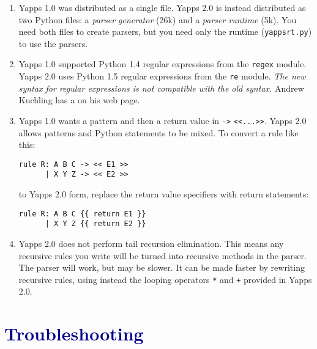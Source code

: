 \documentclass[10pt]{article}
\newcommand{\mysection}[1]{\section{\textcolor{darkblue}{#1}}}
\begin{document}
\begin{enumerate}
 \item Yapps 1.0 was distributed as a single file.  Yapps 2.0 is
   instead distributed as two Python files: a \emph{parser generator}
   (26k) and a \emph{parser runtime} (5k).  You need both files to
   create parsers, but you need only the runtime (\texttt{yappsrt.py})
   to use the parsers.
   
 \item Yapps 1.0 supported Python 1.4 regular expressions from the
   \texttt{regex} module.  Yapps 2.0 uses Python 1.5 regular
   expressions from the \texttt{re} module.  \emph{The new syntax for
     regular expressions is not compatible with the old syntax.}
   Andrew Kuchling has a  on his
   web page.
   
 \item Yapps 1.0 wants a pattern and then a return value in \verb|->|
   \verb|<<...>>|.  Yapps 2.0 allows patterns and Python statements to
   be mixed.  To convert a rule like this:

\begin{verbatim}
rule R: A B C -> << E1 >>
      | X Y Z -> << E2 >>
\end{verbatim}
   
   to Yapps 2.0 form, replace the return value specifiers with return
   statements:

\begin{verbatim}
rule R: A B C {{ return E1 }}
      | X Y Z {{ return E2 }}
\end{verbatim}
   
 \item Yapps 2.0 does not perform tail recursion elimination.  This
   means any recursive rules you write will be turned into recursive
   methods in the parser.  The parser will work, but may be slower.
   It can be made faster by rewriting recursive rules, using instead
   the looping operators \verb|*| and \verb|+| provided in Yapps 2.0.

\end{enumerate}

\mysection{Troubleshooting}
\end{document}
